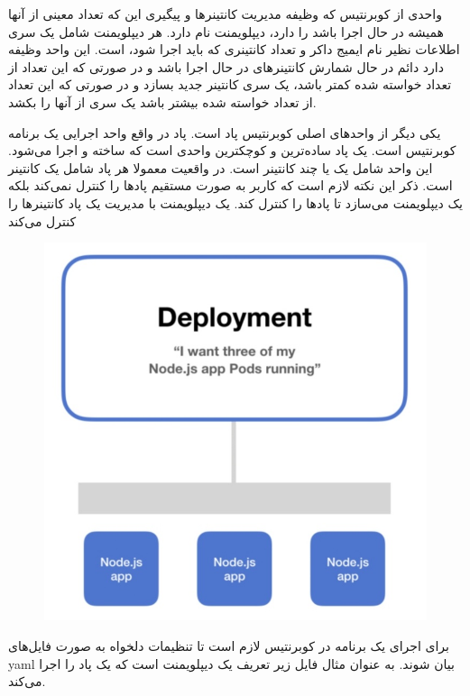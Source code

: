 \documentclass[a4]{report}
\begin{document}
واحدی از کوبرنتیس که وظیفه مدیریت کانتینر‌ها و پیگیری این که تعداد معینی از آنها همیشه در حال اجرا باشد را دارد، دیپلویمنت نام دارد. هر دیپلویمنت شامل یک سری اطلاعات نظیر نام ایمیج داکر و تعداد کانتینری که باید اجرا شود، است. این واحد وظیفه دارد دائم در حال شمارش کانتینر‌های در حال اجرا باشد و در صورتی که این تعداد از تعداد خواسته شده کمتر باشد، یک سری کانتینر جدید بسازد و در صورتی که این تعداد از تعداد خواسته شده بیشتر باشد یک سری از آنها را بکشد.

یکی دیگر از واحدهای اصلی کوبرنتیس پاد است. پاد در واقع واحد اجرایی یک برنامه کوبرنتیس است. یک
پاد ساده‌ترین و کوچکترین واحدی است که ساخته و اجرا می‌شود. این واحد شامل یک یا چند کانتینر است.
در واقعیت معمولا هر پاد شامل یک کانتینر است. ذکر این نکته لازم است که کاربر به صورت مستقیم پاد‌ها را
کنترل نمی‌کند بلکه یک دیپلویمنت می‌سازد تا پادها را کنترل کند. یک دیپلویمنت با مدیریت یک پاد
کانتینر‌ها را کنترل می‌کند

\begin{figure}
  \centering
  \includegraphics[scale=0.5]{fig/deployment}
\end{figure}

برای اجرای یک برنامه در کوبرنتیس لازم است تا تنظیمات دلخواه به صورت فایل‌های {yaml}
بیان شوند. به عنوان مثال فایل زیر تعریف یک دیپلویمنت است که یک پاد را اجرا می‌کند.
\end{document}
